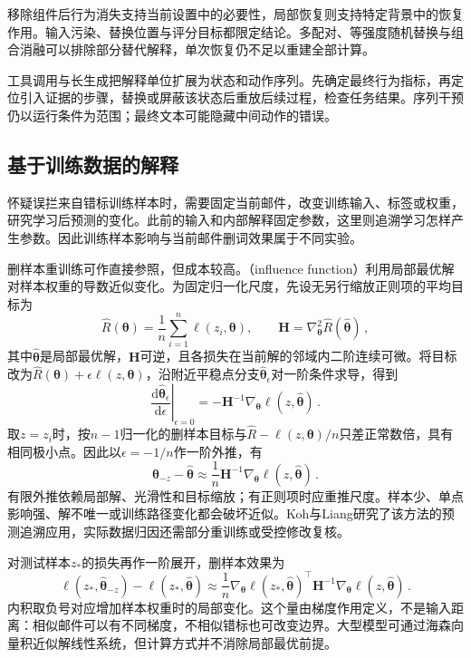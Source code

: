 移除组件后行为消失支持当前设置中的必要性，局部恢复则支持特定背景中的恢复作用。输入污染、替换位置与评分目标都限定结论。多配对、等强度随机替换与组合消融可以排除部分替代解释，单次恢复仍不足以重建全部计算。

工具调用与长生成把解释单位扩展为状态和动作序列。先确定最终行为指标，再定位引入证据的步骤，替换或屏蔽该状态后重放后续过程，检查任务结果。序列干预仍以运行条件为范围；最终文本可能隐藏中间动作的错误。

\subsection{基于训练数据的解释}
\label{sec:interpretability-local-training}

怀疑误拦来自错标训练样本时，需要固定当前邮件，改变训练输入、标签或权重，研究学习后预测的变化。此前的输入和内部解释固定参数，这里则追溯学习怎样产生参数。因此训练样本影响与当前邮件删词效果属于不同实验。

删样本重训练可作直接参照，但成本较高。（influence function）利用局部最优解对样本权重的导数近似变化。为固定归一化尺度，先设无另行缩放正则项的平均目标为
\[
 \hat R(\bm{\theta})=\frac1n\sum_{i=1}^n\ell(z_i,\bm{\theta}),
 \qquad
 \bm H=\nabla_{\bm{\theta}}^2\hat R(\hat{\bm{\theta}})\, ,
\]
其中$\hat{\bm\theta}$是局部最优解，$\bm H$可逆，且各损失在当前解的邻域内二阶连续可微。将目标改为$\hat R(\bm\theta)+\epsilon\ell(z,\bm\theta)$，沿附近平稳点分支$\hat{\bm\theta}_\epsilon$对一阶条件求导，得到
\[
 \left.\frac{\mathrm d\hat{\bm{\theta}}_\epsilon}
 {\mathrm d\epsilon}\right|_{\epsilon=0}
 =-\bm H^{-1}\nabla_{\bm{\theta}}
       \ell(z,\hat{\bm{\theta}})\, .
\]
取$z=z_i$时，按$n-1$归一化的删样本目标与$\hat R-\ell(z,\bm\theta)/n$只差正常数倍，具有相同极小点。因此以$\epsilon=-1/n$作一阶外推，有
\[
 \hat{\bm{\theta}}_{-z}-\hat{\bm{\theta}}
 \approx\frac1n\bm H^{-1}\nabla_{\bm{\theta}}
 \ell(z,\hat{\bm{\theta}})\, .
\]
有限外推依赖局部解、光滑性和目标缩放；有正则项时应重推尺度。样本少、单点影响强、解不唯一或训练路径变化都会破坏近似。Koh与Liang研究了该方法的预测追溯应用，实际数据归因还需部分重训练或受控修改复核。

对测试样本$z_*$的损失再作一阶展开，删样本效果为
\[
 \ell(z_*,\hat{\bm{\theta}}_{-z})
 -\ell(z_*,\hat{\bm{\theta}})
 \approx\frac1n\nabla_{\bm\theta}\ell(z_*,\hat{\bm\theta})^\top
 \bm H^{-1}\nabla_{\bm\theta}\ell(z,\hat{\bm\theta})\, .
\]
内积取负号对应增加样本权重时的局部变化。这个量由梯度作用定义，不是输入距离：相似邮件可以有不同梯度，不相似错标也可改变边界。大型模型可通过海森向量积近似解线性系统，但计算方式并不消除局部最优前提。

